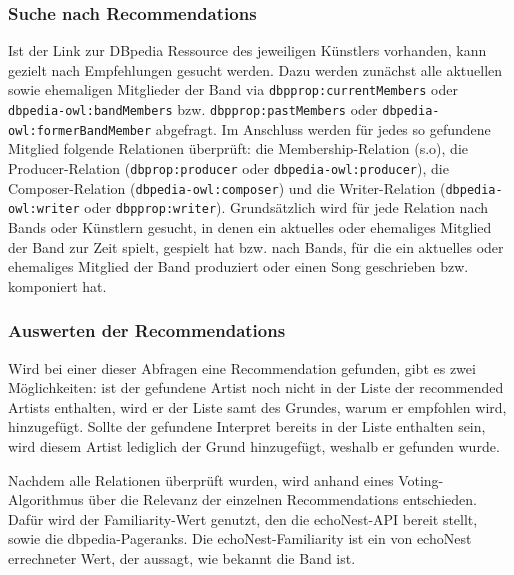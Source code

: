 \subsubsection{Suche nach Recommendations}
Ist der Link zur DBpedia Ressource des jeweiligen Künstlers vorhanden, kann gezielt nach Empfehlungen gesucht werden. Dazu werden zunächst alle aktuellen sowie ehemaligen Mitglieder der Band via \texttt{dbpprop:currentMembers} oder \texttt{dbpedia-owl:bandMembers}  bzw. \texttt{dbpprop:pastMembers} oder \texttt{dbpedia-owl:formerBandMember} abgefragt. Im Anschluss werden für jedes so gefundene Mitglied folgende Relationen überprüft: die Membership-Relation (s.o), die Producer-Relation (\texttt{dbprop:producer} oder \texttt{dbpedia-owl:producer}), die Composer-Relation (\texttt{dbpedia-owl:composer}) und die Writer-Relation (\texttt{dbpedia-owl:writer} oder \texttt{dbpprop:writer}). Grundsätzlich wird für jede Relation nach Bands oder Künstlern gesucht, in denen ein aktuelles oder ehemaliges Mitglied der Band zur Zeit spielt, gespielt hat bzw. nach Bands, für die ein aktuelles oder ehemaliges Mitglied der Band produziert oder einen Song geschrieben bzw. komponiert hat. 

\subsubsection{Auswerten der Recommendations}
Wird bei einer dieser Abfragen eine Recommendation gefunden, gibt es zwei Möglichkeiten: ist der gefundene Artist noch nicht in der Liste der recommended Artists enthalten, wird er der Liste samt des Grundes, warum er empfohlen wird, hinzugefügt. Sollte der gefundene Interpret bereits in der Liste enthalten sein, wird diesem Artist lediglich der Grund hinzugefügt, weshalb er gefunden wurde.  %


Nachdem alle Relationen überprüft wurden, wird anhand eines Voting-Algorithmus über die Relevanz der einzelnen Recommendations entschieden. Dafür wird der Familiarity-Wert genutzt, den die echoNest-API bereit stellt, sowie die dbpedia-Pageranks. Die echoNest-Familiarity ist ein von echoNest errechneter Wert, der aussagt, wie bekannt die Band ist.\cite{echonest_familiarity}

